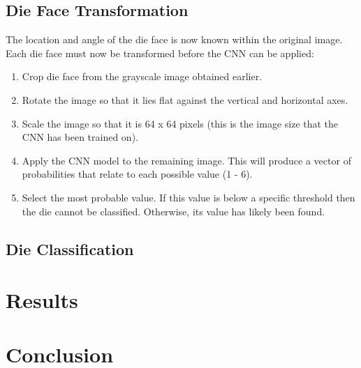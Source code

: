 \documentclass[conference]{IEEEtran}
\begin{document}
\subsection{Die Face Transformation}
The location and angle of the die face is now known within the original image.
Each die face must now be transformed before the CNN can be applied:
\begin{enumerate}
	\item Crop die face from the grayscale image obtained earlier.
	\item Rotate the image so that it lies flat against the vertical and horizontal axes.
	\item Scale the image so that it is 64 x 64 pixels (this is the image size that the CNN has been trained on).
	\item Apply the CNN model to the remaining image. This will produce a vector of probabilities that relate to each possible value (1 - 6).
	\item Select the most probable value. 
		If this value is below a specific threshold then the die cannot be classified.
		Otherwise, its value has likely been found.
\end{enumerate}

\subsection{Die Classification}

\section{Results}

\section{Conclusion}

\printbibliography
\end{document}
